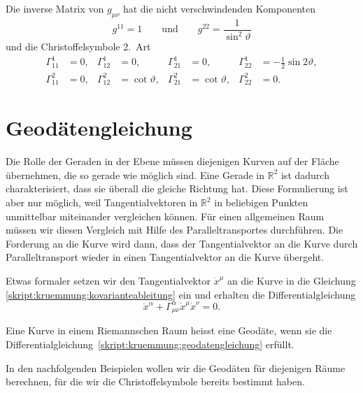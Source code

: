 Die inverse Matrix von $g_{\mu\nu}$ hat die nicht verschwindenden
Komponenten
\[
g^{11} = 1
\qquad\text{und}\qquad
g^{22} = \frac1{\sin^2\vartheta}
\]
und die Christoffelsymbole 2.~Art
\begin{equation}
\begin{aligned}
 \Gamma_{11}^1
&=0,
&\Gamma_{12}^1
&=0,
&\Gamma_{21}^1
&=0,
&\Gamma_{22}^1
&=-\frac12\sin2\vartheta,
\\
 \Gamma_{11}^2
&=0,
&\Gamma_{12}^2
&=\cot\vartheta,
&\Gamma_{21}^2
&=\cot\vartheta,
&\Gamma_{22}^2
&=0.
\end{aligned}
\label{skript:kruemmung:christoffelkugel}
\end{equation}


\section{Geodätengleichung}
Die Rolle der Geraden in der Ebene müssen diejenigen Kurven auf der
Fläche übernehmen, die so gerade wie möglich sind. 
Eine Gerade in $\mathbb R^2$ ist dadurch charakterisiert, dass sie überall
die gleiche Richtung hat. 
Diese Formulierung ist aber nur möglich, weil Tangentialvektoren
in $\mathbb R^2$ in
beliebigen Punkten unmittelbar miteinander vergleichen können.
Für einen allgemeinen Raum müssen wir diesen Vergleich mit Hilfe
des Paralleltransportes durchführen.
Die Forderung an die Kurve wird dann, dass der Tangentialvektor
an die Kurve durch Paralleltransport wieder in einen Tangentialvektor
an die Kurve übergeht.

Etwas formaler setzen wir den Tangentialvektor $\dot x^\mu$ an die
Kurve in die Gleichung \eqref{skript:kruemmung:kovarianteableitung} ein und
erhalten die Differentialgleichung 
\begin{equation}
\ddot x^\alpha+\Gamma_{\mu\nu}^\alpha \dot x^\mu\dot x^\nu=0.
\label{skript:kruemmung:geodatengleichung}
\end{equation}
%

\begin{definition}
Eine Kurve in einem Riemannschen Raum heisst eine Geodäte, wenn sie
die Differentialgleichung~\eqref{skript:kruemmung:geodatengleichung}
erfüllt.
\end{definition}

In den nachfolgenden Beispielen wollen wir die Geodäten für diejenigen
Räume berechnen, für die wir die Christoffelsymbole bereits bestimmt
haben.

%
%

